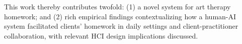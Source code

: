 
This work thereby contributes twofold: (1) a novel system for art therapy homework; and (2) rich empirical findings contextualizing how a human-AI system facilitated clients' homework in daily settings and client-practitioner collaboration, with relevant HCI design implications discussed.





